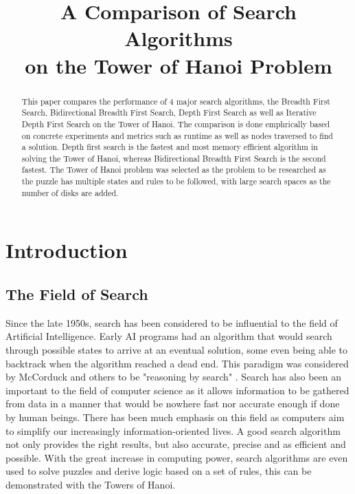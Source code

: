 \documentclass[conference]{IEEEtran}
\begin{document}
\title{A Comparison of Search Algorithms\\ on the Tower of Hanoi Problem  }

\author{
}
\maketitle

\begin{abstract}
This paper compares the performance of 4 major search algorithms, the Breadth First Search, Bidirectional Breadth First Search, Depth First Search as well as Iterative Depth First Search on the Tower of Hanoi. The comparison is done emphrically based on concrete experiments and metrics such as runtime as well as nodes traversed to find a solution. Depth first search is the fastest and most memory efficient algorithm in solving the Tower of Hanoi, whereas Bidirectional Breadth First Search is the second fastest. The Tower of Hanoi problem was selected as the problem to be researched as the puzzle has multiple states and rules to be followed, with large search spaces as the number of disks are added.

\end{abstract}

\section{Introduction}

\subsection{The Field of Search}
Since the late 1950s, search has been considered to be influential to the field of Artificial Intelligence. Early AI programs had an algorithm that would search through possible states to arrive at an eventual solution, some even being able to backtrack when the algorithm reached a dead end. This paradigm was considered by McCorduck and others to be "reasoning by search" \cite{McCorduck01}. Search has also been an important to the field of computer science as it allows information to be gathered from data in a manner that would be nowhere fast nor accurate enough if done by human beings. There has been much emphasis on this field as computers aim to simplify our increasingly information-oriented lives. A good search algorithm not only provides the right results, but also accurate, precise and as efficient and possible. With the great increase in computing power, search algorithms are even used to solve puzzles and derive logic based on a set of rules, this can be demonstrated with the Towers of Hanoi.
\end{document}
